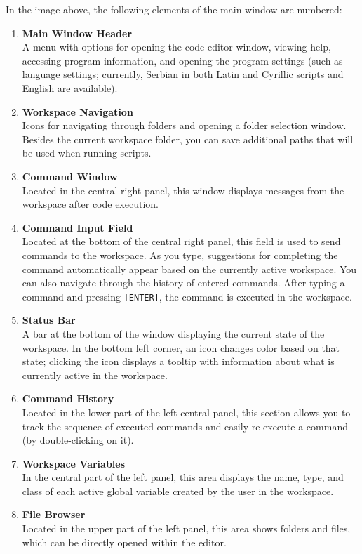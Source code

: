 \documentclass[12pt,a4paper]{article}
\begin{document}
In the image above, the following elements of the main window are numbered:
\begin{enumerate}
  \item \textbf{Main Window Header}\\
        A menu with options for opening the code editor window, viewing help, accessing program information, and opening the program settings (such as language settings; currently, Serbian in both Latin and Cyrillic scripts and English are available).
  \item \textbf{Workspace Navigation}\\
        Icons for navigating through folders and opening a folder selection window. Besides the current workspace folder, you can save additional paths that will be used when running scripts.
  \item \textbf{Command Window}\\
        Located in the central right panel, this window displays messages from the workspace after code execution.
  \item \textbf{Command Input Field}\\
        Located at the bottom of the central right panel, this field is used to send commands to the workspace. As you type, suggestions for completing the command automatically appear based on the currently active workspace. You can also navigate through the history of entered commands. After typing a command and pressing \texttt{[ENTER]}, the command is executed in the workspace.
  \item \textbf{Status Bar}\\
        A bar at the bottom of the window displaying the current state of the workspace. In the bottom left corner, an icon changes color based on that state; clicking the icon displays a tooltip with information about what is currently active in the workspace.
  \item \textbf{Command History}\\
        Located in the lower part of the left central panel, this section allows you to track the sequence of executed commands and easily re-execute a command (by double-clicking on it).
  \item \textbf{Workspace Variables}\\
        In the central part of the left panel, this area displays the name, type, and class of each active global variable created by the user in the workspace.
  \item \textbf{File Browser}\\
        Located in the upper part of the left panel, this area shows folders and files, which can be directly opened within the editor.
\end{enumerate}
\end{document}
